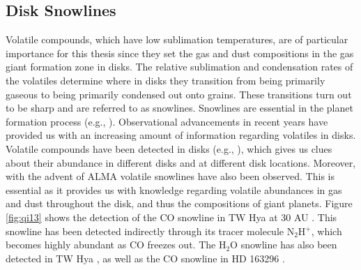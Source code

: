 

\subsection{Disk Snowlines}

Volatile compounds, which have low sublimation temperatures, are of particular importance for this thesis since they set the gas and dust compositions in the gas giant formation zone in disks. The relative sublimation and condensation rates of the volatiles determine where in disks they transition from being primarily gaseous to being primarily condensed out onto grains. These transitions turn out to be sharp and are referred to as snowlines.  Snowlines are essential in the planet formation process (e.g., \citealt{pontoppidan14}). Observational advancements in recent years have provided us with an increasing amount of information regarding volatiles in disks. Volatile compounds have been detected in disks (e.g., \citealt{henning13}), which gives us clues about their abundance in different disks and at different disk locations. Moreover, with the advent of ALMA volatile snowlines have also been observed. This is essential as it provides us with knowledge regarding volatile abundances in gas and dust throughout the disk, and thus the compositions of giant planets. Figure \ref{fig:qi13} shows the detection of the CO snowline in TW Hya at 30 AU \citep{qi13}. This snowline has been detected indirectly through its tracer molecule N$_2$H$^+$, which becomes highly abundant as CO freezes out. The H$_2$O snowline has also been detected in TW Hya \citep{zhang13}, as well as the CO snowline in HD 163296 \citep{qi15}. 

